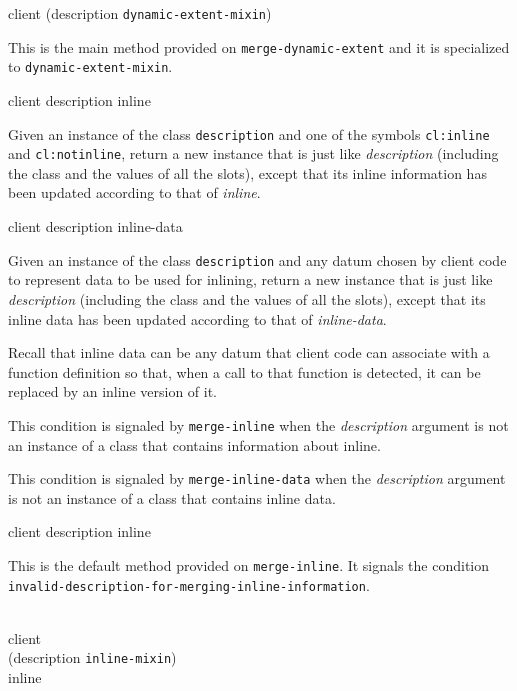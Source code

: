 {\footnotesize
{} {client (description {\tt dynamic-extent-mixin})}
}

This is the main method provided on
\texttt{merge-dynamic-extent} and it is specialized to
\texttt{dynamic-extent-mixin}.

{\footnotesize
{} {client description inline}
}

Given an instance of the class \texttt{description} and one
of the symbols \texttt{cl:inline} and \texttt{cl:notinline},
return a new instance that is just like
\textit{description} (including the class and the values of
all the slots), except that its inline information has been updated
according to that of \textit{inline}.

{\footnotesize
{} {client description inline-data}
}

Given an instance of the class \texttt{description} and any datum
chosen by client code to represent data to be used for inlining,
return a new instance that is just like \textit{description}
(including the class and the values of all the slots), except that its
inline data has been updated according to that of
\textit{inline-data}.

Recall that inline data can be any datum that client code can
associate with a function definition so that, when a call to that
function is detected, it can be replaced by an inline version of it.

{\footnotesize
{}
}

This condition is signaled by \texttt{merge-inline} when the
\textit{description} argument is not an instance of a class that
contains information about inline.

{\footnotesize
{}
}

This condition is signaled by \texttt{merge-inline-data} when the
\textit{description} argument is not an instance of a class that
contains inline data.

{\footnotesize
{} {client description inline}
}

This is the default method provided on \texttt{merge-inline}.  It
signals the condition
\texttt{invalid-description-for-merging-inline-information}.

{\footnotesize
{}\\
           {client\\
            (description {\tt inline-mixin})\\
            inline}
}

